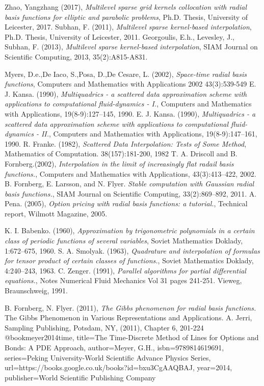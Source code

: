 \documentclass[a4paper]{amsart}
\begin{document}
\newpage
\begin{thebibliography}{99}
 Zhao, Yangzhang (2017), {\em Multilevel sparse grid kernels collocation with radial basis functions for elliptic and parabolic problems}, Ph.D. Thesis, University of Leicester, 2017.
 Subhan, F. (2011), {\em Multilevel sparse kernel-based interpolation}, Ph.D. Thesis, University of Leicester, 2011.
 Georgoulis, E.h., Levesley, J., Subhan, F. (2013), {\em Multilevel sparse kernel-based interpolation}, SIAM Journal on Scientific Computing, 2013, 35(2):A815-A831.


 Myers, D.e.,De Iaco, S.,Posa, D.,De Cesare, L. (2002), {\em Space-time radial basis functions}, Computers and Mathematics with Applications 2002 43(3):539-549
 E. J. Kansa. (1990), {\em Multiquadrics - a scattered data approximation scheme
with applications to computational fluid-dynamics - I.}, Computers and Mathematics with Applications, 19(8-9):127–145, 1990.
 E. J. Kansa. (1990), {\em Multiquadrics - a scattered data approximation scheme
with applications to computational fluid-dynamics - II.}, Computers and Mathematics with Applications, 19(8-9):147–161, 1990.
 R. Franke. (1982), {\em Scattered Data Interpolation: Tests of Some Method}, Mathematics of Computation. 38(157):181-200, 1982
 T. A. Driscoll and B. Fornberg.(2002), {\em Interpolation in the limit of increasingly flat radail basis functions.}, Computers and Mathematics with Applications, 43(3):413–422, 2002.
 B. Fornberg, E. Larsson, and N. Flyer. {\em Stable computation with Gaussian radial basis functions.}, SIAM Journal on Scientific Computing,
33(2):869–892, 2011.
 A. Pena. (2005), {\em Option pricing with radial basis functions: a tutorial.}, Technical
report, Wilmott Magazine, 2005.

 K. I. Babenko. (1960), {\em Approximation by trigonometric polynomials in a certain class of periodic functions of several variables}, Soviet Mathematics Doklady, 1:672–675, 1960.
 S. A. Smolyak. (1963), {\em Quadrature and interpolation of formulas for tensor product of certain classes of functions.}, Soviet Mathematics Doklady, 4:240–243, 1963.
 C. Zenger. (1991), {\em Parallel algorithms for partial differential equations.}, Notes Numerical Fluid Mechanics Vol 31 pages 241-251. Vieweg, Braunschweig, 1991.

 B. Fornberg, N. Flyer. (2011), {\em The Gibbs phenomenon for radial basis functions.} The Gibbs Phenomenon in Various Representations and Applications.  A. Jerri, Sampling Publishing, Potsdam, NY, (2011), Chapter 6, 201-224
@book{meyer2014time,
  title={The Time-Discrete Method of Lines for Options and Bonds: A PDE Approach},
  author={Meyer, G.H.},
  isbn={9789814619691},
  series={Peking University-World Scientific Advance Physics Series},
  url={https://books.google.co.uk/books?id=bxu3CgAAQBAJ},
  year={2014},
  publisher={World Scientific Publishing Company}
}


\end{thebibliography}
\end{document}
